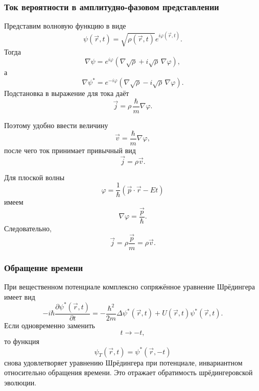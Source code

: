 \documentclass[12pt,a4paper]{article}
\begin{document}
\subsubsection{Ток вероятности в амплитудно-фазовом представлении}

Представим волновую функцию в виде
\[
    \boxed{
        \psi(\vec r,t)
        =
        \sqrt{\rho(\vec r,t)}
        e^{i\varphi(\vec r,t)}
    }.
\]
Тогда
\[
    \nabla\psi
    =
    e^{i\varphi}
    \left(
        \nabla\sqrt\rho
        +
        i\sqrt\rho\,\nabla\varphi
    \right),
\]
а
\[
    \nabla\psi^*
    =
    e^{-i\varphi}
    \left(
        \nabla\sqrt\rho
        -
        i\sqrt\rho\,\nabla\varphi
    \right).
\]
Подстановка в выражение для тока даёт
\[
    \boxed{
        \vec j
        =
        \rho\,
        \frac{\hbar}{m}
        \nabla\varphi
    }.
\]

Поэтому удобно ввести величину
\[
    \boxed{
        \vec v
        =
        \frac{\hbar}{m}\nabla\varphi
    },
\]
после чего ток принимает привычный вид
\[
    \boxed{
        \vec j=\rho\vec v
    }.
\]

Для плоской волны
\[
    \varphi
    =
    \frac{1}{\hbar}
    \left(
        \vec p\cdot\vec r-Et
    \right)
\]
имеем
\[
    \nabla\varphi
    =
    \frac{\vec p}{\hbar}.
\]
Следовательно,
\[
    \boxed{
        \vec j
        =
        \rho\frac{\vec p}{m}
        =
        \rho\vec v
    }.
\]


\subsubsection{Обращение времени}

При вещественном потенциале комплексно сопряжённое уравнение
Шрёдингера имеет вид
\[
    -i\hbar
    \frac{\partial\psi^*(\vec r,t)}{\partial t}
    =
    -\frac{\hbar^2}{2m}
    \Delta\psi^*(\vec r,t)
    +
    U(\vec r,t)\psi^*(\vec r,t).
\]
Если одновременно заменить
\[
    t\longrightarrow -t,
\]
то функция
\[
    \boxed{
        \psi_T(\vec r,t)
        =
        \psi^*(\vec r,-t)
    }
\]
снова удовлетворяет уравнению Шрёдингера при потенциале, инвариантном
относительно обращения времени. Это отражает обратимость
шрёдингеровской эволюции.

\end{document}
